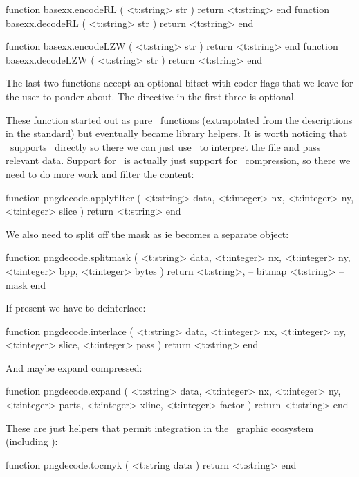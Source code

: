 function basexx.encodeRL  ( <t:string> str ) return <t:string> end
function basexx.decodeRL  ( <t:string> str ) return <t:string> end

function basexx.encodeLZW ( <t:string> str ) return <t:string> end
function basexx.decodeLZW ( <t:string> str ) return <t:string> end
\stoptyping

The last two functions accept an optional bitset with coder flags that we leave
for the user to ponder about. The  directive in the first three is
optional.

\stopsubsection

\startsubsection[title=\PNG\ decoding]

These function started out as pure \LUA\ functions (extrapolated from the
descriptions in the standard) but eventually became library helpers. It is
worth noticing that \PDF\ supports \JPEG\ directly so there we can just use
\LUA\ to interpret the file and pass relevant data. Support for \PNG\ is
actually just support for \PNG\ compression, so there we need to do more
work and filter the content:

\starttyping[option=LUA]
function pngdecode.applyfilter (
    <t:string>  data,
    <t:integer> nx,
    <t:integer> ny,
    <t:integer> slice
)
    return <t:string>
end
\stoptyping

We also need to split off the mask as ie becomes a separate object:

\starttyping[option=LUA]
function pngdecode.splitmask (
    <t:string>  data,
    <t:integer> nx,
    <t:integer> ny,
    <t:integer> bpp,
    <t:integer> bytes
)
    return
        <t:string>, -- bitmap
        <t:string>  -- mask
end
\stoptyping

If present we have to deinterlace:

\starttyping[option=LUA]
function pngdecode.interlace (
    <t:string>  data,
    <t:integer> nx,
    <t:integer> ny,
    <t:integer> slice,
    <t:integer> pass
)
    return <t:string>
end
\stoptyping

And maybe expand compressed:

\starttyping[option=LUA]
function pngdecode.expand (
    <t:string>  data,
    <t:integer> nx,
    <t:integer> ny,
    <t:integer> parts,
    <t:integer> xline,
    <t:integer> factor
)
    return <t:string>
end
\stoptyping

These are just helpers that permit integration in the \CONTEXT\ graphic
ecosystem (including \METAPOST):

\starttyping[option=LUA]
function pngdecode.tocmyk ( <t:string data )
    return <t:string>
end
\stoptyping

